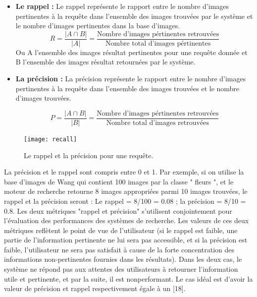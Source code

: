 \begin{itemize}
	\item \textbf{Le rappel :}
	Le rappel représente le rapport entre le nombre d’images pertinentes à la
	requête dans l’ensemble des images trouvées par le système et le nombre
	d’images pertinentes dans la base d’images.
	\begin{equation}
		R = \frac{| A \cap B|}{| A |} = \frac{\text{Nombre d'images pértinentes retrouvées}}{\text{Nombre total d'images pértinentes}}
	\end{equation}
	Ou A l’ensemble des images résultat pertinentes pour une requête donnée et
	B l’ensemble des images résultat retournées par le système.
	
	\item \textbf{La précision :}
	La précision représente le rapport entre le nombre d’images pertinentes à la
	requête dans l’ensemble des images trouvées et le nombre d’images trouvées.
	
	\begin{equation}
	P = \frac{| A \cap B|}{| B |} = \frac{\text{Nombre d'images pértinentes retrouvées}}{\text{Nombre total d'images retrouvées}}
	\end{equation}
	
\end{itemize}

\begin{figure}[H]
	\centering
	\texttt{[image: recall]} 
	\caption{ Le rappel et la précision pour une requête.}
\end{figure}

La précision et le rappel sont compris entre 0 et 1. Par exemple, si on utilise
la base d’images de Wang qui contient 100 images par la classe " fleurs ", et
le moteur de recherche retourne 8 images appropriées parmi 10 images
trouvées, le rappel et la précision seront :
Le rappel = 8/100 = 0.08 ; la précision = 8/10 = 0.8.
Les deux métriques "rappel et précision" s’utilisent conjointement pour
l’évaluation des performances des systèmes de recherche. Les valeurs de ces
deux métriques reflètent le point de vue de l’utilisateur (si le rappel est faible,
une partie de l’information pertinente ne lui sera pas accessible, et si la
précision est faible, l’utilisateur ne sera pas satisfait à cause de la forte
concentration des informations non-pertinentes fournies dans les résultats).
Dans les deux cas, le système ne répond pas aux attentes des utilisateurs à
retourner l’information utile et pertinente, et par la suite, il est nonperformant. Le cas idéal est d’avoir la valeur de précision et rappel
respectivement égale à un [18].

